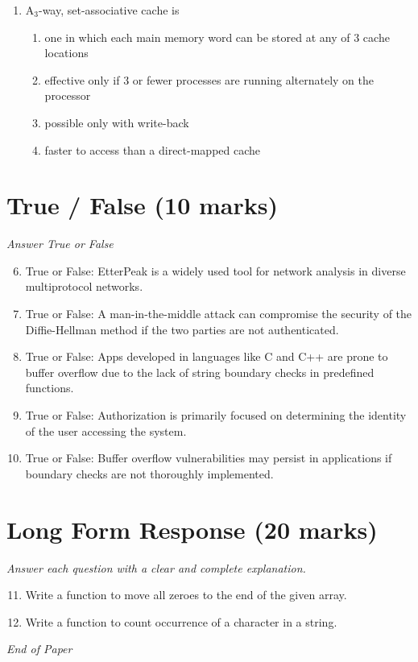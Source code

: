 \documentclass[12pt]{article}
\begin{document}
\begin{enumerate}[label=\arabic*.]
\begin{enumerate}[label=(\alph*)]
    \item Only once
    \item Twice
    \item Multiple times
    \item Conditions dependant
\end{enumerate}
\item A$_{3}$-way, set-associative cache is
\begin{enumerate}[label=(\alph*)]
    \item one in which each main memory word can be stored at any of 3 cache locations
    \item effective only if 3 or fewer processes are running alternately on the processor
    \item possible only with write-back
    \item faster to access than a direct-mapped cache
\end{enumerate}
\end{enumerate}

\section*{True / False (10 marks)}
\textit{Answer True or False}
\begin{enumerate}[label=\arabic*.]
\setcounter{enumi}{5}
\item True or False: EtterPeak is a widely used tool for network analysis in diverse multiprotocol networks.
\item True or False: A man-in-the-middle attack can compromise the security of the Diffie-Hellman method if the two parties are not authenticated.
\item True or False: Apps developed in languages like C and C++ are prone to buffer overflow due to the lack of string boundary checks in predefined functions.
\item True or False: Authorization is primarily focused on determining the identity of the user accessing the system.
\item True or False: Buffer overflow vulnerabilities may persist in applications if boundary checks are not thoroughly implemented.
\end{enumerate}

\section*{Long Form Response (20 marks)}
\textit{Answer each question with a clear and complete explanation.}
\begin{enumerate}[label=\arabic*.]
\setcounter{enumi}{10}
\item Write a function to move all zeroes to the end of the given array.
\item Write a function to count occurrence of a character in a string.
\end{enumerate}

\vfill
\noindent\textit{End of Paper}
\end{document}
